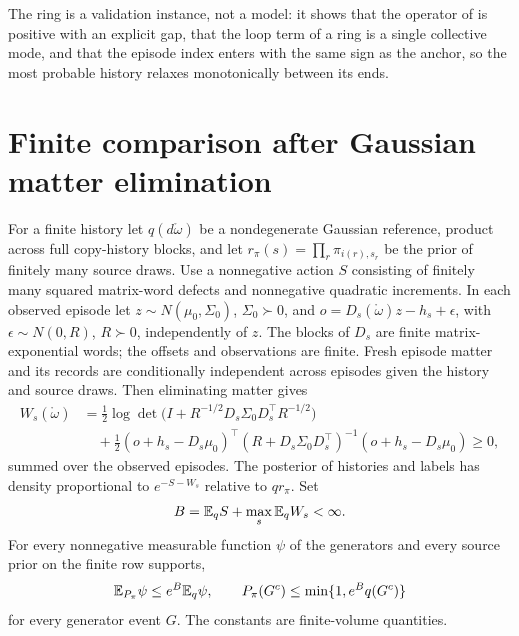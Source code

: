 The ring is a validation instance, not a model: it shows that the operator of
 is positive with an explicit gap, that the loop term of a ring is a
single collective mode, and that the episode index enters with the same sign as the anchor, so the most
probable history relaxes monotonically between its ends.

\section{Finite comparison after Gaussian matter elimination}
\label{sec:glink-finite-native-comparison}

For a finite history let $q(d\mathring\omega)$ be a nondegenerate Gaussian
reference, product across full copy-history blocks, and let
$r_\pi(s)=\prod_r\pi_{i(r),s_r}$ be the prior of finitely many source draws.
Use a nonnegative action $S$ consisting of finitely many squared matrix-word
defects and nonnegative quadratic increments. In each observed episode let
$z\sim N(\mu_0,\Sigma_0)$, $\Sigma_0\succ0$, and
$o=D_s(\mathring\omega)z-h_s+\epsilon$, with
$\epsilon\sim N(0,R)$, $R\succ0$, independently of $z$. The blocks of $D_s$
are finite matrix-exponential words; the offsets and observations are finite.
Fresh episode matter and its records are conditionally independent across
episodes given the history and source draws. Then eliminating matter gives
\begin{equation}
\begin{split}
W_s(\mathring\omega)
&=\frac12\log\det\bigl(I+R^{-1/2}D_s\Sigma_0D_s^\top R^{-1/2}\bigr)\\
&\quad+\frac12(o+h_s-D_s\mu_0)^\top
(R+D_s\Sigma_0D_s^\top)^{-1}(o+h_s-D_s\mu_0)\ge0,
\end{split}
\label{eq:glink-collapsed-record-action}
\end{equation}
summed over the observed episodes. The posterior of histories and labels has
density proportional to $e^{-S-W_s}$ relative to $q r_\pi$. Set
\begin{equation}
B=\mathbb E_q S+\max_s\mathbb E_q W_s<\infty.
\label{eq:glink-reference-envelope}
\end{equation}
For every nonnegative measurable function $\psi$ of the generators and every
source prior on the finite row supports,
\begin{equation}
\mathbb E_{P_\pi}\psi\le e^B\mathbb E_q\psi,\qquad
P_\pi(G^c)\le\min\{1,e^Bq(G^c)\}
\label{eq:glink-native-tail-envelope}
\end{equation}
for every generator event $G$. The constants are finite-volume quantities.

